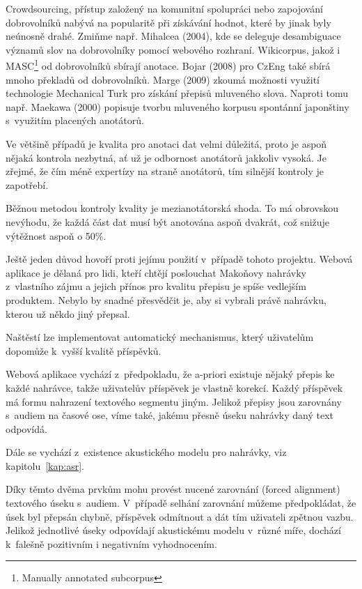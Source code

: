 Crowdsourcing, přístup založený na komunitní spolupráci nebo zapojování
dobrovolníků nabývá na popularitě při získávání hodnot, které by jinak byly
neúnosně drahé. Zmiňme např. Mihalcea (2004)\cite{mihalcea2004building}, kde se
deleguje desambiguace významů slov na dobrovolníky pomocí webového rozhraní.
Wikicorpus\cite{reese2010wikicorpus}, jakož i MASC\footnote{Manually annotated
subcorpus}\cite{ide2010manually} od dobrovolníků sbírají anotace. Bojar
(2008)\cite{bojar2008czeng} pro CzEng také sbírá mnoho překladů od dobrovolníků.
Marge (2009)\cite{5494979} zkoumá možnosti využití technologie Mechanical Turk
pro získání přepisů mluveného slova.
Naproti tomu např. Maekawa (2000)\cite{maekawa2000spontaneous} popisuje tvorbu
mluveného korpusu spontánní japonštiny s~využitím placených anotátorů.

Ve většině případů je kvalita pro anotaci dat velmi důležitá, proto je aspoň
nějaká kontrola nezbytná, ať už je odbornost anotátorů jakkoliv vysoká. Je
zřejmé, že čím méně expertízy na straně anotátorů, tím silnější kontroly je
zapotřebí.

Běžnou metodou kontroly kvality je mezianotátorská shoda. To má obrovskou
nevýhodu, že každá část dat musí být anotována aspoň dvakrát, což snižuje
výtěžnost aspoň o 50\%.

Ještě jeden důvod hovoří proti jejímu použití v~případě tohoto projektu. Webová
aplikace je dělaná pro lidi, kteří chtějí poslouchat Makoňovy nahrávky
z~vlastního zájmu a jejich přínos pro kvalitu přepisu je spíše vedlejším
produktem. Nebylo by snadné přesvědčit je, aby si vybrali právě nahrávku, kterou
už někdo jiný přepsal.

Naštěstí lze implementovat automatický mechanismus, který uživatelům dopomůže
k~vyšší kvalitě příspěvků.

Webová aplikace vychází z~předpokladu, že a-priori existuje nějaký přepis ke
každé nahrávce, takže uživatelův příspěvek je vlastně korekcí. Každý příspěvek
má formu nahrazení textového segmentu jiným. Jelikož přepisy jsou zarovnány
s~audiem na časové ose, víme také, jakému přesně úseku nahrávky daný text
odpovídá.

Dále se vychází z~existence akustického modelu pro nahrávky, viz kapitolu~\ref{kap:asr}.

Díky těmto dvěma prvkům mohu provést nucené zarovnání (forced alignment) textového úseku
s~audiem. V~případě selhání zarovnání můžeme předpokládat, že úsek byl přepsán
chybně, příspěvek odmítnout a dát tím uživateli zpětnou vazbu. Jelikož
jednotlivé úseky odpovídají akustickému modelu v~různé míře, dochází k~falešně
pozitivním i negativním vyhodnocením.

